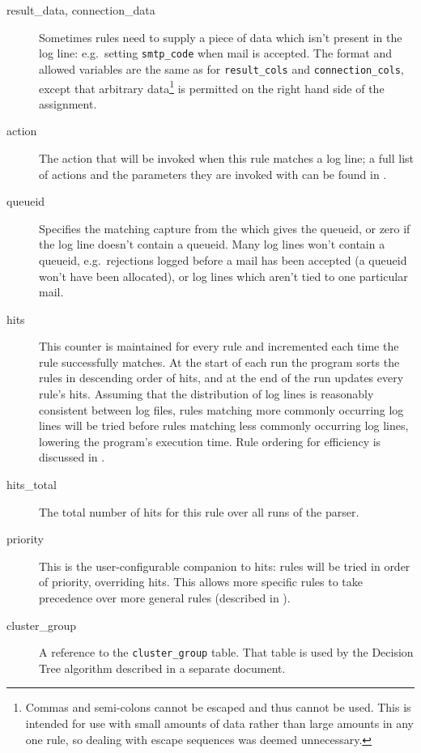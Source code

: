 \begin{description}
    \item [result\_data, connection\_data] Sometimes rules need to supply a
        piece of data which isn't present in the log line: e.g.\ setting
        \texttt{smtp\_code} when mail is accepted.  The format and allowed
        variables are the same as for \texttt{result\_cols} and
        \texttt{connection\_cols}, except that arbitrary
        data\footnote{Commas and semi-colons cannot be escaped and thus
        cannot be used.  This is intended for use with small amounts of
        data rather than large amounts in any one rule, so dealing with
        escape sequences was deemed unnecessary.} is permitted on the right
        hand side of the assignment.

    \item [action] The action that will be invoked when this rule matches a
        log line; a full list of actions and the parameters they are
        invoked with can be found in .

    \item [queueid] Specifies the matching capture from the \regex{} which
        gives the queueid, or zero if the log line doesn't contain a
        queueid.  Many log lines won't contain a queueid, e.g.\ rejections
        logged before a mail has been accepted (a queueid won't have been
        allocated), or log lines which aren't tied to one particular mail.

    \item [hits] This counter is maintained for every rule and incremented
        each time the rule successfully matches.  At the start of each run
        the program sorts the rules in descending order of hits, and at the
        end of the run updates every rule's hits.  Assuming that the
        distribution of log lines is reasonably consistent between log
        files, rules matching more commonly occurring log lines will be
        tried before rules matching less commonly occurring log lines,
        lowering the program's execution time.  Rule ordering for
        efficiency is discussed in .

    \item [hits\_total] The total number of hits for this rule over all
        runs of the parser.

    \item [priority] This is the user-configurable companion to hits: rules
        will be tried in order of priority, overriding hits.  This allows
        more specific rules to take precedence over more general rules
        (described in ).

    \item [cluster\_group] A reference to the \texttt{cluster\_group}
        table.  That table is used by the Decision Tree algorithm described
        in a separate document.

\end{description}


